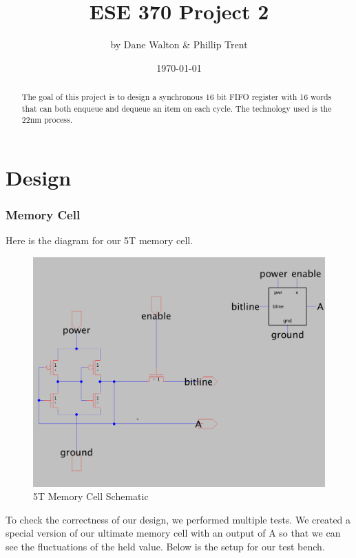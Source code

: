 \documentclass[a4paper]{article}
\title{ESE 370 Project 2}
\author{by Dane Walton \& Phillip Trent}
\date{\today}
\begin{document}
\maketitle

\begin{abstract}
The goal of this project is to design a synchronous 16 bit FIFO register with 16 words that can both enqueue and dequeue an item on each cycle. The technology used is the 22nm process.
\end{abstract}

\section{Design}
\label{sec:design}
\subsubsection{Memory Cell}
Here is the diagram for our 5T memory cell.\\

\begin{figure}[H]
	\centering
 \includegraphics[scale=0.2]{5TCell}
 \caption{5T Memory Cell Schematic}
 \label{fig:5TCell}
\end{figure}
 
To check the correctness of our design, we performed multiple tests. We created a special version of our ultimate memory cell with an output of A so that we can see the fluctuations of the held value. Below is the setup for our test bench.\\
\end{document}
